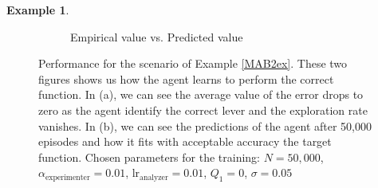 \documentclass[11pt,a4paper,twoside]{report}
\newcommand{\+}{\textnormal{+} }
\theoremstyle{definition}
\newtheorem{myex}[mythm]{Example}
\numberwithin{equation}{chapter}
\begin{document}
\begin{myex}
\begin{figure}[]
\begin{subfigure}{.5\textwidth}
        \caption{Empirical value vs. Predicted value}
        \label{fig:predictionsMAB2}
      \end{subfigure}
      \caption{Performance for the scenario of Example \ref{MAB2ex}. These two
      figures shows us how the agent learns to perform the correct function. In
      (a), we can see the average value of the error drops to zero as the agent
      identify the correct lever and the exploration rate vanishes. In (b), we
      can see the predictions of the agent after 50,000 episodes and how it fits
      with acceptable accuracy the target function. Chosen parameters for the
      training:  $N=50,000$, $\alpha_\text{experimenter}=0.01$,
      $\text{lr}_\text{analyzer}=0.01$, $Q_1=0$, $\sigma=0.05$}
    \end{figure} 
  \end{myex}
\end{document}

